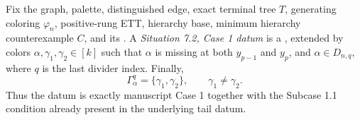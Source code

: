 \begin{definition}
Fix the graph, palette, distinguished edge, exact terminal tree \(T\),
generating coloring \(\varphi_n\), positive-rung ETT, hierarchy base,
minimum hierarchy counterexample \(C\), and its
.  A
\emph{Situation 7.2, Case 1 datum} is a
, extended by colors
\(\alpha,\gamma_1,\gamma_2\in[k]\) such that \(\alpha\) is missing at
both \(y_{p-1}\) and \(y_p\), and
\(\alpha\in D_{n,q}\), where \(q\) is the last divider index.  Finally,
\[
 \Gamma^q_\alpha=\{\gamma_1,\gamma_2\},\qquad
 \gamma_1\ne\gamma_2.
\]
Thus the datum is exactly manuscript Case 1 together with the
Subcase 1.1 condition already present in the underlying tail datum.
\end{definition}

